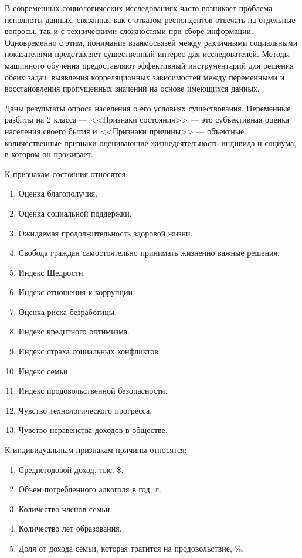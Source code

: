 
В современных социологических исследованиях часто возникает проблема неполноты данных, связанная как с отказом респондентов отвечать на отдельные вопросы, так и с техническими сложностями при сборе информации. Одновременно с этим, понимание взаимосвязей между различными социальными показателями представляет существенный интерес для исследователей. Методы машинного обучения предоставляют эффективный инструментарий для решения обеих задач: выявления корреляционных зависимостей между переменными и восстановления пропущенных значений на основе имеющихся данных.

Даны результаты опроса населения о его условиях существования. Переменные разбиты на 2 класса --- <<Признаки состояния>> --- это субъективная оценка населения своего бытия и <<Признаки причины>> --- объектные количественные признаки оценивающие жизнедеятельность индивида и социума, в котором он проживает.

К признакам состояния относятся:
\begin{enumerate}[label*=\arabic*.]
	\item Оценка благополучия.
	\item Оценка социальной поддержки.
	\item Ожидаемая продолжительность здоровой жизни.
	\item Свобода граждан самостоятельно принимать жизненно важные решения.
	\item Индекс Щедрости.
	\item Индекс отношения к коррупции.
	\item Оценка риска безработицы.
	\item Индекс кредитного оптимизма.
	\item Индекс страха социальных конфликтов.
	\item Индекс семьи.
	\item Индекс продовольственной безопасности.
	\item Чувство технологического прогресса.
	\item Чувство неравенства доходов в обществе.
\end{enumerate}

К индивидуальным признакам причины относятся:
\begin{enumerate}[label*=\arabic*.]
	\item Среднегодовой доход, тыс. \$.
	\item Объем потребленного алкоголя в год, л.
	\item Количество членов семьи.
	\item Количество лет образования.
	\item Доля от дохода семьи, которая тратится на продовольствие, \%.
\end{enumerate}

